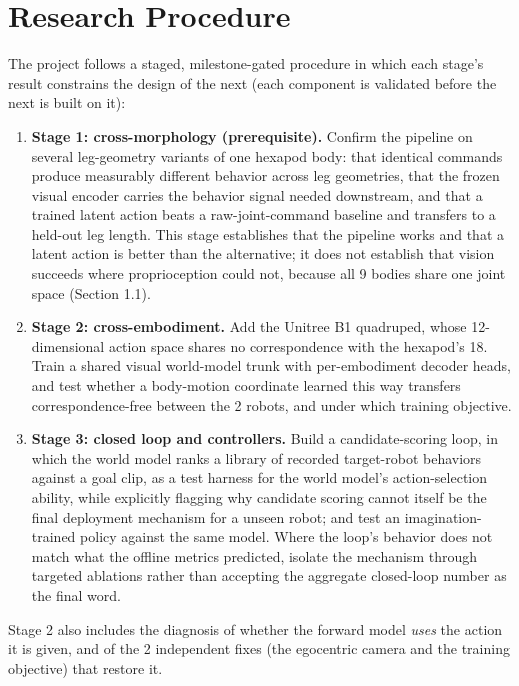 \documentclass[12pt,a4paper,oneside]{report}
\begin{document}
\section{Research Procedure}
The project follows a staged, milestone-gated procedure in which each stage's result constrains the design of the
next (each component is validated before the next is built on it):
\begin{enumerate}[label=\arabic*.]
\item \textbf{Stage 1: cross-morphology (prerequisite).} Confirm the pipeline on several leg-geometry variants of one
  hexapod body: that identical commands produce measurably different behavior across leg geometries, that the frozen
  visual encoder carries the behavior signal needed downstream, and that a trained latent action beats a
  raw-joint-command baseline and transfers to a held-out leg length. This stage establishes that the pipeline
  works and that a latent action is better than the alternative; it does not establish that vision succeeds where
  proprioception could not, because all 9 bodies share one joint space (Section 1.1).
\item \textbf{Stage 2: cross-embodiment.} Add the Unitree B1 quadruped, whose 12-dimensional action space shares
  no correspondence with the hexapod's 18. Train a shared visual world-model trunk with per-embodiment decoder
  heads, and test whether a body-motion coordinate learned this way transfers correspondence-free between the 2
  robots, and under which training objective.
\item \textbf{Stage 3: closed loop and controllers.} Build a candidate-scoring loop, in which the world model ranks a
  library of recorded target-robot behaviors against a goal clip, as a test harness for the world model's
  action-selection ability, while explicitly flagging why candidate scoring cannot itself be the final deployment
  mechanism for a unseen robot; and test an imagination-trained policy against the
  same model. Where the loop's behavior does not match what the offline metrics predicted, isolate the mechanism
  through targeted ablations rather than accepting the aggregate closed-loop number as the final word.
\end{enumerate}

\noindent Stage 2 also includes the diagnosis of whether the forward model \emph{uses} the action it is given, and of
the 2 independent fixes (the egocentric camera and the training objective) that restore it.

\end{document}
